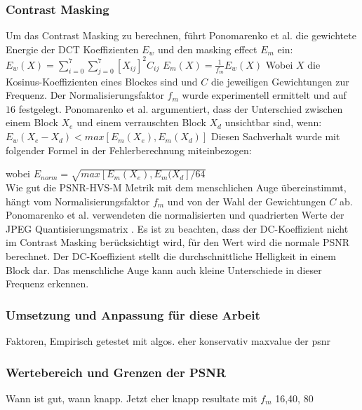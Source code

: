 \subsubsection{Contrast Masking}
Um das Contrast Masking zu berechnen, führt Ponomarenko et al. die gewichtete Energie der DCT Koeffizienten $E_w$ und den masking effect $E_m$ ein:\\
$E_w(X) = \sum_{i=0}^{7}\sum_{j=0}^{7}[X_{ij}]^2 C_{ij}$
$E_m(X) = \frac{1}{f_m}E_w(X)$
Wobei $X$ die Kosinus-Koeffizienten eines Blockes sind und $C$ die jeweiligen Gewichtungen zur Frequenz. Der Normalisierungsfaktor $f_m$ wurde experimentell ermittelt und auf $16$ festgelegt. Ponomarenko et al. argumentiert, dass der Unterschied zwischen einem Block $X_e$ und einem verrauschten Block $X_d$ unsichtbar sind, wenn:
$E_w(X_e-X_d) < max[E_m(X_e),E_m(X_d)]$
Diesen Sachverhalt wurde mit folgender Formel in der Fehlerberechnung miteinbezogen:

wobei $E_{norm} = \sqrt{max[E_m(X_e),E_m(X_d] / 64}$\\
[\baselineskip]
Wie gut die PSNR-HVS-M Metrik mit dem menschlichen Auge übereinstimmt, hängt vom Normalisierungsfaktor $f_m$ und von der Wahl der Gewichtungen $C$ ab. Ponomarenko et al. verwendeten die normalisierten und quadrierten Werte der JPEG Quantisierungsmatrix \cite{wallace1992jpeg}. Es ist zu beachten, dass der DC-Koeffizient nicht im Contrast Masking berücksichtigt wird, für den Wert wird die normale PSNR berechnet. Der DC-Koeffizient stellt die durchschnittliche Helligkeit in einem Block dar. Das menschliche Auge kann auch kleine Unterschiede in dieser Frequenz erkennen.

\subsubsection{Umsetzung und Anpassung für diese Arbeit}
Faktoren, Empirisch getestet mit algos. eher konservativ
maxvalue der psnr

\subsubsection{Wertebereich und Grenzen der PSNR}
Wann ist gut, wann knapp. Jetzt eher knapp
resultate mit $f_m$
16,40, 80